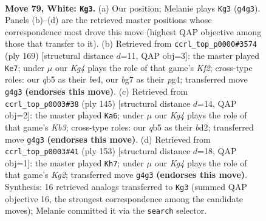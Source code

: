 \documentclass[11pt]{article}
\begin{document}
\clearpage

\begin{figure}[p]\centering
\begin{subfigure}{0.46\textwidth}\centering
\resizebox{\linewidth}{!}{%
\newchessgame
\chessboard[
  setfen={8/2k3b1/8/1q6/6K1/8/8/5q2 w - - 0 79},
  showmover=false,
  pgfstyle=straightmove, color=movearrow, markmove={g4-g3}
]}
\caption{}
\end{subfigure}\hfill
\begin{subfigure}{0.46\textwidth}\centering
\resizebox{\linewidth}{!}{%
\newchessgame
\chessboard[
  setfen={Q7/5k2/7K/8/4B1P1/8/8/8 b - - 1 85},
  showmover=false,
  pgfstyle=straightmove, color=movearrow, markmove={f7-e7}
]}
\caption{}
\end{subfigure}
\\[4pt]
\begin{subfigure}{0.46\textwidth}\centering
\resizebox{\linewidth}{!}{%
\newchessgame
\chessboard[
  setfen={8/6K1/1k6/8/1Q6/8/2bB4/8 b - - 2 73},
  showmover=false,
  pgfstyle=straightmove, color=movearrow, markmove={b6-a6}
]}
\caption{}
\end{subfigure}\hfill
\begin{subfigure}{0.46\textwidth}\centering
\resizebox{\linewidth}{!}{%
\newchessgame
\chessboard[
  setfen={1Q6/6k1/4Q3/8/8/8/K2B4/3R4 b - - 0 77},
  showmover=false,
  pgfstyle=straightmove, color=movearrow, markmove={g7-h7}
]}
\caption{}
\end{subfigure}
\caption{\textbf{Move 79, White: \texttt{Kg3}.} (a) Our position; Melanie plays \texttt{Kg3} (\texttt{g4g3}). Panels (b)--(d) are the retrieved master positions whose correspondence most drove this move (highest QAP objective among those that transfer to it). (b) Retrieved from \texttt{ccrl\_top\_p0000\#3574} (ply 169) [structural distance $d$=11, QAP obj=3]: the master played \texttt{Ke7}; under $\mu$ our \emph{Kg4} plays the role of that game's \emph{Kf2}; cross-type roles: our \emph{q}b5 as their \emph{b}e4, our \emph{b}g7 as their \emph{p}g4; transferred move \texttt{g4g3} \textbf{(endorses this move)}. (c) Retrieved from \texttt{ccrl\_top\_p0003\#38} (ply 145) [structural distance $d$=14, QAP obj=2]: the master played \texttt{Ka6}; under $\mu$ our \emph{Kg4} plays the role of that game's \emph{Kb3}; cross-type roles: our \emph{q}b5 as their \emph{b}d2; transferred move \texttt{g4g3} \textbf{(endorses this move)}. (d) Retrieved from \texttt{ccrl\_top\_p0003\#41} (ply 153) [structural distance $d$=18, QAP obj=1]: the master played \texttt{Kh7}; under $\mu$ our \emph{Kg4} plays the role of that game's \emph{Kg2}; transferred move \texttt{g4g3} \textbf{(endorses this move)}. Synthesis: 16 retrieved analogs transferred to \texttt{Kg3} (summed QAP objective 16, the strongest correspondence among the candidate moves); Melanie committed it via the \texttt{search} selector.}
\label{fig:thought-m156}
\end{figure}
\end{document}
